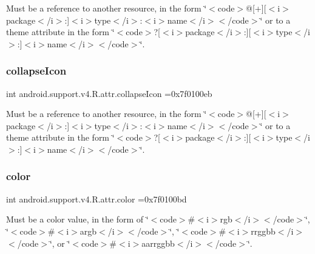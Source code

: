 Must be a reference to another resource, in the form \char`\"{}$<$code$>$@\mbox{[}+\mbox{]}\mbox{[}$<$i$>$package$<$/i$>$\+:\mbox{]}$<$i$>$type$<$/i$>$\+:$<$i$>$name$<$/i$>$$<$/code$>$\char`\"{} or to a theme attribute in the form \char`\"{}$<$code$>$?\mbox{[}$<$i$>$package$<$/i$>$\+:\mbox{]}\mbox{[}$<$i$>$type$<$/i$>$\+:\mbox{]}$<$i$>$name$<$/i$>$$<$/code$>$\char`\"{}. \mbox{\label{classandroid_1_1support_1_1v4_1_1R_1_1attr_a5d0cc1bfeb940bcc6a12235499982d6d}} 
\subsubsection{\texorpdfstring{collapse\+Icon}{collapseIcon}}
{\footnotesize\ttfamily int android.\+support.\+v4.\+R.\+attr.\+collapse\+Icon =0x7f0100eb\hspace{0.3cm}{\ttfamily [static]}}

Must be a reference to another resource, in the form \char`\"{}$<$code$>$@\mbox{[}+\mbox{]}\mbox{[}$<$i$>$package$<$/i$>$\+:\mbox{]}$<$i$>$type$<$/i$>$\+:$<$i$>$name$<$/i$>$$<$/code$>$\char`\"{} or to a theme attribute in the form \char`\"{}$<$code$>$?\mbox{[}$<$i$>$package$<$/i$>$\+:\mbox{]}\mbox{[}$<$i$>$type$<$/i$>$\+:\mbox{]}$<$i$>$name$<$/i$>$$<$/code$>$\char`\"{}. \mbox{\label{classandroid_1_1support_1_1v4_1_1R_1_1attr_ae88bfab69b7797740137d224e6656578}} 
\subsubsection{\texorpdfstring{color}{color}}
{\footnotesize\ttfamily int android.\+support.\+v4.\+R.\+attr.\+color =0x7f0100bd\hspace{0.3cm}{\ttfamily [static]}}

Must be a color value, in the form of \char`\"{}$<$code$>$\#$<$i$>$rgb$<$/i$>$$<$/code$>$\char`\"{}, \char`\"{}$<$code$>$\#$<$i$>$argb$<$/i$>$$<$/code$>$\char`\"{}, \char`\"{}$<$code$>$\#$<$i$>$rrggbb$<$/i$>$$<$/code$>$\char`\"{}, or \char`\"{}$<$code$>$\#$<$i$>$aarrggbb$<$/i$>$$<$/code$>$\char`\"{}. 

